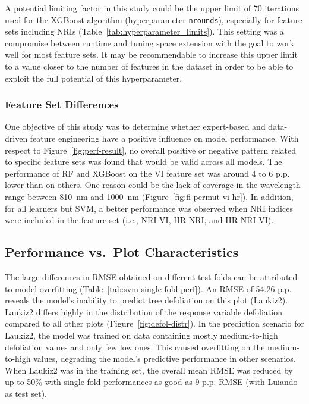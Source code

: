 \documentclass[remotesensing,article,accept,moreauthors,pdftex]{Definitions/mdpi}
\begin{document}
\begin{paracol}{2}
A potential limiting factor in this study could be the upper limit of 70 iterations used for the XGBoost algorithm (hyperparameter \texttt{nrounds}), especially for feature sets including NRIs (Table~\ref{tab:hyperparameter_limits}).
This setting was a compromise between runtime and tuning space extension with the goal to work well for most feature sets.
It may be recommendable to increase this upper limit to a value closer to the number of features in the dataset in order to be able to exploit the full potential of this hyperparameter.

\subsubsection{Feature Set Differences}

One objective of this study was to determine whether expert-based and data-driven feature engineering have a positive influence on model performance.
With respect to Figure~\ref{fig:perf-result}, no overall positive or negative pattern related to specific feature sets was found that would be valid across all models.
The performance of RF and XGBoost on the VI feature set was around 4 to 6 p.p. lower than on others.
One reason could be the lack of coverage in the wavelength range between 810~nm and 1000~nm (Figure~\ref{fig:fi-permut-vi-hr}).
In addition, for all learners but SVM, a better performance was observed when NRI indices were included in the feature set (i.e., NRI-VI, HR-NRI, and HR-NRI-VI).

\subsection{Performance vs.\ Plot Characteristics}
\label{subsec:perf-plot-char}

The large differences in RMSE obtained on different test folds can be attributed to model overfitting (Table~\ref{tab:svm-single-fold-perf}).
An RMSE of 54.26 p.p. reveals the model's inability to predict tree defoliation on this plot (Laukiz2).
Laukiz2 differs highly in the distribution of the response variable defoliation compared to all other plots (Figure~\ref{fig:defol-distr}).
In the prediction scenario for Laukiz2, the model was trained on data containing mostly medium-to-high defoliation values and only few low ones.
This caused overfitting on the medium-to-high values, degrading the model's predictive performance in other scenarios.
When Laukiz2 was in the training set, the overall mean RMSE was reduced by up to 50\% with single fold performances as good as 9 p.p. RMSE (with Luiando as test set).


\end{paracol}
\end{document}
